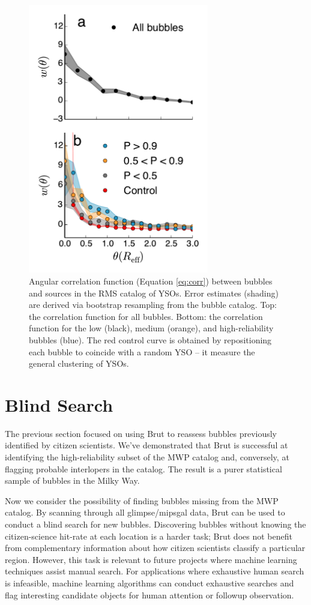 \begin{figure}[h!]
\includegraphics[width=3.1in]{trigger}
\caption{Angular correlation function (Equation \ref{eq:corr}) between bubbles and sources in the RMS catalog of YSOs. Error estimates (shading) are derived via bootstrap resampling from the bubble catalog. Top: the correlation function for all bubbles. Bottom: the correlation function for the
low (black), medium (orange), and high-reliability bubbles (blue). The red control curve is obtained by repositioning each bubble to coincide with a random YSO -- it measure the general clustering of YSOs.}
\label{fig:trigger}
\end{figure}

\section{Blind Search}
\label{sec:blind}
The previous section focused on using Brut to reassess bubbles previously identified by citizen scientists. We've demonstrated that Brut is successful at identifying the high-reliability subset of the MWP catalog and, conversely, at flagging probable interlopers in the catalog. The result is a purer statistical sample of bubbles in the Milky Way.

Now we consider the possibility of finding bubbles missing from the MWP catalog. By scanning through all {\sc glimpse}/{\sc mipsgal} data, Brut can be used to conduct a blind search for new bubbles. Discovering bubbles without knowing the citizen-science hit-rate at each location is a harder task; Brut does not benefit from complementary information about how citizen scientists classify a particular region. However, this task is relevant to future projects where machine learning techniques assist manual search. For applications where exhaustive human search is infeasible, machine learning algorithms can conduct exhaustive searches and flag interesting candidate objects for human attention or followup observation.

